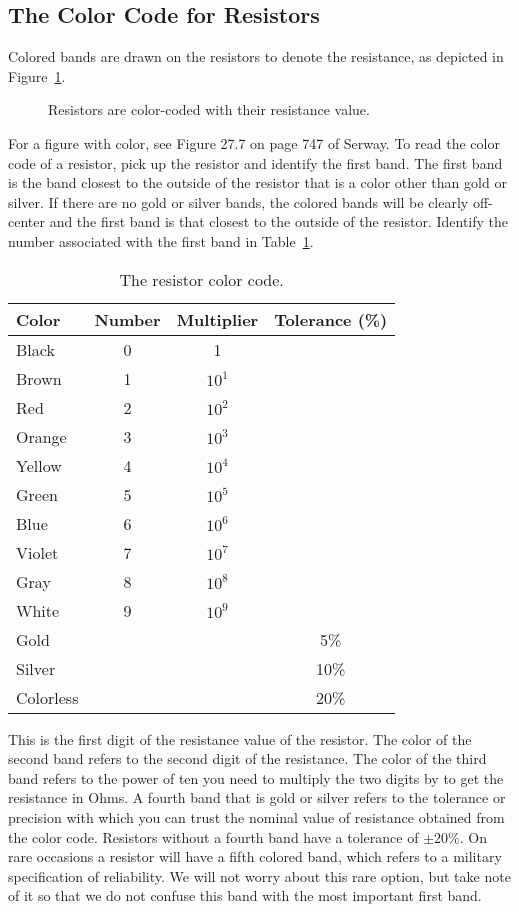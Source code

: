 \subsection{The Color Code for Resistors}

Colored bands are drawn on the resistors to denote the resistance, as 
depicted in Figure~\ref{fig:DC:colorcode}. 
\begin{figure}
\centerline{\epsfxsize=9cm }
\caption{Resistors are color-coded with their resistance value.}
\label{fig:DC:colorcode}
\end{figure}
For a figure with color, see Figure 27.7 on page 747 of Serway.
To read the color code of a resistor, pick up the resistor and identify the
first band. The first band is the band closest to the outside of the resistor 
that is a color other than gold or silver.  If there are no gold or silver 
bands, the colored bands will be clearly off-center and the first band is that 
closest to the outside of the resistor.  Identify the number associated
with the first band in Table~\ref{tab:DC:colorcode}. 
\begin{table}[htb]
\begin{center}
\begin{tabular}{|l|c|c|c|}
\hline
Color & Number & Multiplier & Tolerance (\%) \\
\hline
Black     & 0 & 1      &      \\
Brown     & 1 & $10^1$ &      \\
Red       & 2 & $10^2$ &      \\
Orange    & 3 & $10^3$ &      \\
Yellow    & 4 & $10^4$ &      \\
Green     & 5 & $10^5$ &      \\
Blue      & 6 & $10^6$ &      \\
Violet    & 7 & $10^7$ &      \\
Gray      & 8 & $10^8$ &      \\
White     & 9 & $10^9$ &      \\
Gold      &   &        & 5\%  \\
Silver    &   &        & 10\% \\
Colorless &   &        & 20\% \\
\hline
\end{tabular}
\end{center}
\caption{The resistor color code.}
\label{tab:DC:colorcode}
\end{table}
This is the first digit of the resistance value of the resistor.  The color of 
the second band refers to the second digit of the resistance. The color of the 
third band refers to the power of ten you need to multiply the two digits by 
to get the resistance in Ohms. A fourth band that is gold or silver refers to 
the tolerance or precision with which you can trust the nominal value of 
resistance obtained from the color code. Resistors without a fourth band have
a tolerance of $\pm 20$\%.  On rare occasions a resistor will have a fifth 
colored band, which refers to a military specification of reliability. We will 
not worry about this rare option, but take note of it so that we do not 
confuse this band with the most important first band.

